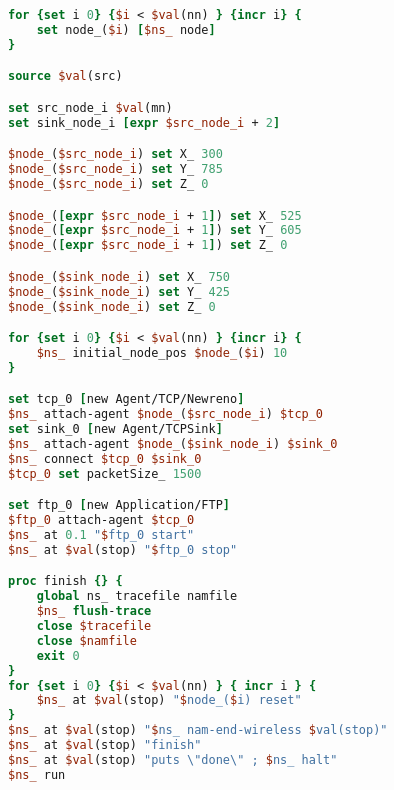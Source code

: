 \begin{lstlisting}[language=tcl, style=mystyle, caption=Файл main.tcl]
for {set i 0} {$i < $val(nn) } {incr i} {
    set node_($i) [$ns_ node]	
}

source $val(src)

set src_node_i $val(mn)
set sink_node_i [expr $src_node_i + 2]

$node_($src_node_i) set X_ 300
$node_($src_node_i) set Y_ 785
$node_($src_node_i) set Z_ 0

$node_([expr $src_node_i + 1]) set X_ 525
$node_([expr $src_node_i + 1]) set Y_ 605
$node_([expr $src_node_i + 1]) set Z_ 0

$node_($sink_node_i) set X_ 750
$node_($sink_node_i) set Y_ 425
$node_($sink_node_i) set Z_ 0

for {set i 0} {$i < $val(nn) } {incr i} {
    $ns_ initial_node_pos $node_($i) 10
}

set tcp_0 [new Agent/TCP/Newreno]
$ns_ attach-agent $node_($src_node_i) $tcp_0
set sink_0 [new Agent/TCPSink]
$ns_ attach-agent $node_($sink_node_i) $sink_0
$ns_ connect $tcp_0 $sink_0
$tcp_0 set packetSize_ 1500

set ftp_0 [new Application/FTP]
$ftp_0 attach-agent $tcp_0
$ns_ at 0.1 "$ftp_0 start"
$ns_ at $val(stop) "$ftp_0 stop"

proc finish {} {
    global ns_ tracefile namfile
    $ns_ flush-trace
    close $tracefile
    close $namfile
    exit 0
}
for {set i 0} {$i < $val(nn) } { incr i } {
    $ns_ at $val(stop) "$node_($i) reset"
}
$ns_ at $val(stop) "$ns_ nam-end-wireless $val(stop)"
$ns_ at $val(stop) "finish"
$ns_ at $val(stop) "puts \"done\" ; $ns_ halt"
$ns_ run
\end{lstlisting}